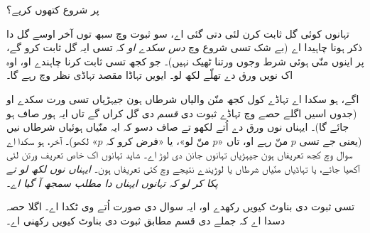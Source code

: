 \documentclass[../../../include/open-logic-section]{subfiles}
\begin{document}


پر شروع کتھوں کریے؟

تہانوں کوئی گل ثابت کرن لئی دتی گئی اے، سو ثبوت وچ سبھ توں آخر اوسے گل دا ذکر ہونا چاہیدا اے (بے شک تسی شروع وچ \emph{دس سکدے او} کہ تسی ایہ گل ثابت کرو گے، پر اینوں منّی ہوئی شرط وجوں ورتنا ٹھیک نہیں)۔ جو کجھ تسی ثابت کرنا چاہندے او، اوہ اک نویں ورق دے تھلّے لکھ لو۔ ایویں تہاڈا مقصد تہاڈی نظر وچ رہے گا۔

اگے، ہو سکدا اے تہاڈے کول کجھ منّن والیاں شرطاں ہون جیہڑیاں تسی ورت سکدے او (جدوں اسیں اگلے حصے وچ تہاڈے ثبوت دی \emph{قسم} دی گل کراں گے تاں ایہ ہور صاف ہو جائے گا)۔ ایہناں نوں ورق دے اُتے لکھو تے صاف دسو کہ ایہ منّیاں ہوئیاں شرطاں نیں (یعنی جے تسی $p$ منّ رہے او، تاں «$p$ منّ لو»، یا «فرض کرو کہ $p$» لکھو)۔ آخر، ہو سکدا اے سوال وچ کجھ تعریفاں ہون جیہڑیاں تہانوں جانن دی لوڑ اے۔ شاید تہانوں اک خاص تعریف ورتن لئی آکھیا جائے، یا تہاڈیاں منّیاں شرطاں یا لوڑیندے نتیجے وچ کئی تعریفاں ہون۔ \emph{ایہناں نوں لکھ لو تے پکا کر لو کہ تہانوں ایہناں دا مطلب سمجھ آ گیا اے۔}

تسی ثبوت دی بناوٹ کیویں رکھدے او، ایہ سوال دی صورت اُتے وی ٹکدا اے۔ اگلا حصہ دسدا اے کہ جملے دی قسم مطابق ثبوت دی بناوٹ کیویں رکھنی اے۔
\end{document}
